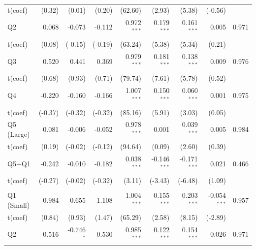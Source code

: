{\begin{longtable}[t]{lrrrrrrrr}
\hspace{1em}t(coef) & (0.32) & (0.01) & (0.20) & (62.60) & (2.93) & (5.38) & (-0.56) & \\
\hspace{1em}Q2 & 0.068 & -0.073 & -0.112 & 0.972$^{***}$ & 0.179$^{***}$ & 0.161$^{***}$ & 0.005 & 0.971\\
\hspace{1em}t(coef) & (0.08) & (-0.15) & (-0.19) & (63.24) & (5.38) & (5.34) & (0.21) & \\
\hspace{1em}Q3 & 0.520 & 0.441 & 0.369 & 0.979$^{***}$ & 0.181$^{***}$ & 0.138$^{***}$ & 0.009 & 0.976\\
\hspace{1em}t(coef) & (0.68) & (0.93) & (0.71) & (79.74) & (7.61) & (5.78) & (0.52) & \\
\hspace{1em}Q4 & -0.220 & -0.160 & -0.166 & 1.007$^{***}$ & 0.150$^{***}$ & 0.060$^{***}$ & 0.001 & 0.975\\
\hspace{1em}t(coef) & (-0.37) & (-0.32) & (-0.32) & (85.16) & (5.91) & (3.03) & (0.05) & \\
\hspace{1em}Q5 (Large) & 0.081 & -0.006 & -0.052 & 0.978$^{***}$ & 0.001 & 0.039$^{***}$ & 0.005 & 0.984\\
\hspace{1em}t(coef) & (0.19) & (-0.02) & (-0.12) & (94.64) & (0.09) & (2.60) & (0.39) & \\
\hspace{1em}Q5$-$Q1 & -0.242 & -0.010 & -0.182 & 0.038$^{***}$ & -0.146$^{***}$ & -0.171$^{***}$ & 0.021 & 0.466\\
\hspace{1em}t(coef) & (-0.27) & (-0.02) & (-0.32) & (3.11) & (-3.43) & (-6.48) & (1.09) & \\
\addlinespace[0.3em]
\hline
\multicolumn{9}{l}{Passive --- EW}\\
\hspace{1em}Q1 (Small) & 0.984 & 0.655 & 1.108 & 1.004$^{***}$ & 0.155$^{***}$ & 0.203$^{***}$ & -0.054$^{***}$ & 0.957\\
\hspace{1em}t(coef) & (0.84) & (0.93) & (1.47) & (65.29) & (2.58) & (8.15) & (-2.89) & \\
\hspace{1em}Q2 & -0.516 & -0.746$^{*}$ & -0.530 & 0.985$^{***}$ & 0.122$^{***}$ & 0.154$^{***}$ & -0.026 & 0.971\\

\end{longtable}}
